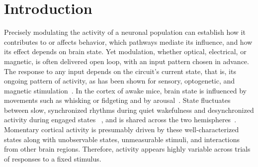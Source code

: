 \section*{Introduction}

Precisely modulating the activity of a neuronal population can establish how it contributes to or affects behavior, which pathways mediate its influence, and how its effect depends on brain state.
Yet modulation, whether optical, electrical, or magnetic, is often delivered open loop, with an input pattern chosen in advance.
The response to any input depends on the circuit's current state, that is, its ongoing pattern of activity, as has been shown for sensory, optogenetic, and magnetic stimulation~\citep{Arieli1996, Petersen2003, Goris2014, Mateo2011, Massimini2005}.
In the cortex of awake mice, brain state is influenced by movements such as whisking or fidgeting and by arousal~\citep{Niell2010, McGinley2015, Vinck2015, musall2019single, stringer2019spontaneous, Salkoff2020}. State fluctuates between slow, synchronized rhythms during quiet wakefulness and desynchronized activity during engaged states ~\citep{Crochet2006, Poulet2008, Reimer2014}, and is shared across the two hemispheres~\citep{Mohajerani2010, Shimaoka2019, Ye2026}.
Momentary cortical activity is presumably driven by these well-characterized states along with unobservable states,  unmeasurable stimuli, and interactions from other brain regions.
Therefore, activity appears highly variable across trials of responses to a fixed stimulus.

